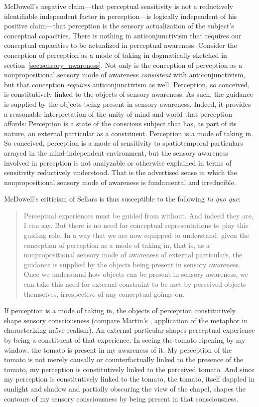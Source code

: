 \documentclass[12pt]{article}
\begin{document}
McDowell's negative claim---that perceptual sensitivity is not a reductively identifiable independent factor in perception---is logically independent of his positive claim---that perception is the sensory actualization of the subject's conceptual capacities. There is nothing in anticonjunctivism that requires our conceptual capacities to be actualized in perceptual awareness. Consider the conception of perception as a mode of taking in dogmatically sketched in section~\ref{sec:sensory_awareness}. Not only is the conception of perception as a nonpropositional sensory mode of awareness \emph{consistent} with anticonjunctivism, but that conception \emph{requires} anticonjunctivism as well. Perception, so conceived, is constitutively linked to the objects of sensory awareness. As such, the guidance is supplied by the objects being present in sensory awareness. Indeed, it provides a reasonable interpretation of the unity of mind and world that perception affords: Perception is a state of the conscious subject that has, as part of its nature, an external particular as a constituent. Perception is a mode of taking in. So conceived, perception is a mode of sensitivity to spatiotemporal particulars arrayed in the mind-independent environment, but the sensory awareness involved in perception is not analyzable or otherwise explained in terms of sensitivity reductively understood. That is the advertised sense in which the nonpropositional sensory mode of awareness is fundamental and irreducible. 

McDowell's criticism of Sellars is thus susceptible to the following \emph{tu quo que}: 
\begin{quote}
    Perceptual experiences must be guided from without. And indeed they are, I can say. But there is no need for conceptual representations to play this guiding role. In a way that we are now equipped to understand, given the conception of perception as a mode of taking in, that is, as a nonpropositional sensory mode of awareness of external particulars, the guidance is supplied by the objects being present in sensory awareness. Once we understand how objects can be present in sensory awareness, we can take this need for external constraint to be met by perceived objects themselves, irrespective of any conceptual goings-on.
\end{quote}

If perception is a mode of taking in, the objects of perception constitutively shape sensory consciousness (compare Martin's \citeyear[64]{Martin:2004fj}, application of the metaphor in characterizing naïve realism). An external particular shapes perceptual experience by being a constituent of that experience. In seeing the tomato ripening by my window, the tomato is present in my awareness of it. My perception of the tomato is not merely causally or counterfactually linked to the presence of the tomato, my perception is constitutively linked to the perceived tomato. And since my perception is constitutively linked to the tomato, the tomato, itself dappled in sunlight and shadow and partially obscuring the view of the chapel, shapes the contours of my sensory consciousness by being present in that consciousness.
\end{document}
